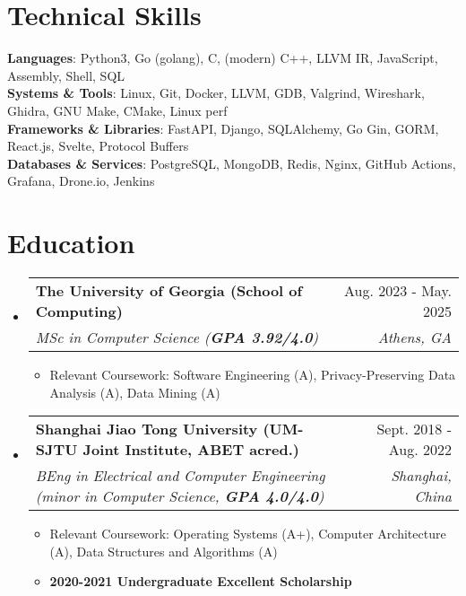 \documentclass[letterpaper,11pt]{article}
\makeatletter
\newcommand{\resumeItem}[1]{
  \item\small{
    {#1 \vspace{-2pt}}
  }
}
\newcommand{\resumeSubHeader}[4]{
  \vspace{-2pt}\item
    \begin{tabular*}{0.98\textwidth}[t]{l@{\extracolsep{\fill}}r}
      \textbf{#1} & #2 \\
      \textit{\small#3} & \textit{\small #4} \\
    \end{tabular*}\vspace{-7pt}
}
\newcommand{\resumeSubHeaderListStart}{\begin{itemize}[leftmargin=0.15in, label={}]}
\newcommand{\resumeSubHeaderListEnd}{\end{itemize}}
\newcommand{\resumeItemListStart}{\begin{itemize}}
\newcommand{\resumeItemListEnd}{\end{itemize}\vspace{-5pt}}
\makeatother
\begin{document}
\section{Technical Skills}
 \begin{itemize}[leftmargin=0.15in, label={}]
    \small{
      \item{
     \textbf{Languages}{: Python3, Go (golang), C, (modern) C++, LLVM IR, JavaScript, Assembly, Shell, SQL} \\
     \textbf{Systems \& Tools}{: Linux, Git, Docker, LLVM, GDB, Valgrind, Wireshark, Ghidra, GNU Make, CMake, Linux perf} \\
     \textbf{Frameworks \& Libraries}{: FastAPI, Django, SQLAlchemy, Go Gin, GORM, React.js, Svelte, Protocol Buffers} \\
     \textbf{Databases \& Services}{: PostgreSQL, MongoDB, Redis, Nginx, GitHub Actions, Grafana, Drone.io, Jenkins}
    }}
 \end{itemize}

\section{Education}
  \resumeSubHeaderListStart
    \resumeSubHeader
      {The University of Georgia (School of Computing)}{Aug. 2023 - May. 2025}
      {MSc in Computer Science (\textbf{GPA 3.92/4.0})}{Athens, GA}
      \resumeItemListStart
        \resumeItem{Relevant Coursework: Software Engineering (A), Privacy-Preserving Data Analysis (A), Data Mining (A)}
      \resumeItemListEnd
    \resumeSubHeader
      {Shanghai Jiao Tong University (UM-SJTU Joint Institute, ABET acred.)}{Sept. 2018 - Aug. 2022}
      {BEng in Electrical and Computer Engineering (minor in Computer Science, \textbf{GPA 4.0/4.0})}{Shanghai, China}
      \resumeItemListStart
        \resumeItem{Relevant Coursework: Operating Systems (A+), Computer Architecture (A), Data Structures and Algorithms (A)}
        \resumeItem{\textbf{2020-2021 Undergraduate Excellent Scholarship}}
      \resumeItemListEnd
  \resumeSubHeaderListEnd
\end{document}
